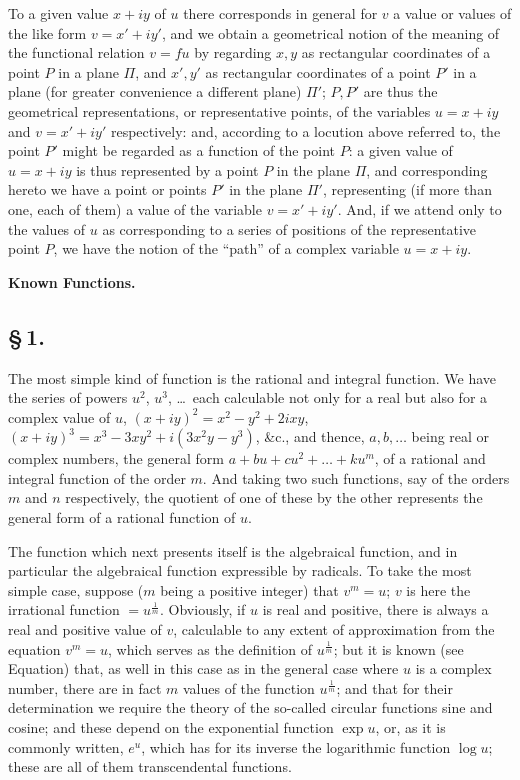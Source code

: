 \documentclass[11pt,a4paper]{article}
\begin{document}
To a given value $x + iy$ of $u$ there corresponds in general for $v$ a value or values of the like form $v = x' + iy'$, and we obtain a geometrical notion of the meaning of the functional relation $v = fu$ by regarding $x, y$ as rectangular coordinates of a point $P$ in a plane $\Pi$, and $x', y'$ as rectangular coordinates of a point $P'$ in a plane (for greater convenience a different plane) $\Pi'$; $P, P'$ are thus the geometrical representations, or representative points, of the variables $u = x + iy$ and $v = x' + iy'$ respectively: and, according to a locution above referred to, the point $P'$ might be regarded as a function of the point $P$: a given value of $u = x + iy$ is thus represented by a point $P$ in the plane $\Pi$, and corresponding hereto we have a point or points $P'$ in the plane $\Pi'$, representing (if more than one, each of them) a value of the variable $v = x' + iy'$. And, if we attend only to the values of $u$ as corresponding to a series of positions of the representative point $P$, we have the notion of the ``path'' of a complex variable $u = x + iy$.

\smallskip
\begin{center}\textbf{Known Functions.}\end{center}

\subsection*{\S\,1.}

The most simple kind of function is the rational and integral function. We have the series of powers $u^{2}$, $u^{3}$, \ldots\ each calculable not only for a real but also for a complex value of $u$, $(x + iy)^{2} = x^{2} - y^{2} + 2ixy$, $(x + iy)^{3} = x^{3} - 3xy^{2} + i(3x^{2}y - y^{3})$, \&c., and thence, $a, b, \ldots$ being real or complex numbers, the general form $a + bu + cu^{2} + \ldots + ku^{m}$, of a rational and integral function of the order $m$. And taking two such functions, say of the orders $m$ and $n$ respectively, the quotient of one of these by the other represents the general form of a rational function of $u$.

The function which next presents itself is the algebraical function, and in particular the algebraical function expressible by radicals. To take the most simple case, suppose ($m$ being a positive integer) that $v^{m} = u$; $v$ is here the irrational function $= u^{\frac{1}{m}}$. Obviously, if $u$ is real and positive, there is always a real and positive value of $v$, calculable to any extent of approximation from the equation $v^{m} = u$, which serves as the definition of $u^{\frac{1}{m}}$; but it is known (see Equation) that, as well in this case as in the general case where $u$ is a complex number, there are in fact $m$ values of the function $u^{\frac{1}{m}}$; and that for their determination we require the theory of the so-called circular functions sine and cosine; and these depend on the exponential function $\exp u$, or, as it is commonly written, $e^{u}$, which has for its inverse the logarithmic function $\log u$; these are all of them transcendental functions.
\end{document}
